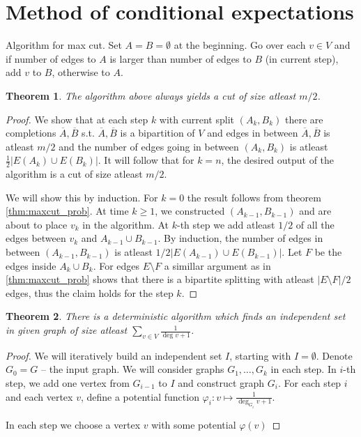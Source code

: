 \documentclass{article}
\theoremstyle{plain}
\newtheorem{thm}{Theorem}
\theoremstyle{definition}
\begin{document}
\section{Method of conditional expectations}


Algorithm for max cut. Set $A=B=\emptyset$ at the beginning. Go over each $v\in V$ and if number of edges to $A$ is larger than number of edges to $B$ (in current step), add $v$ to $B$, otherwise to $A$.

\begin{thm}
	The algorithm above always yields a cut of size atleast $m/2$.
\end{thm}
\begin{proof}
	We show that at each step $k$ with current split $(A_k,B_k)$ there are completions $\overline{A},\overline{B}$ s.t. $\overline{A},\overline{B}$ is a bipartition of $V$ and edges in between $\overline{A},\overline{B}$ is atleast $m/2$ and the number of edges going in between $(A_k,B_k)$ is atleast $\frac{1}{2}|E(A_k)\cup E(B_k)|$. It will follow that for $k=n$, the desired output of the algorithm is a cut of size atleast $m/2$.
	
	We will show this by induction. For $k=0$ the result follows from theorem \ref{thm:maxcut_prob}. At time $k\geq 1$, we constructed $(A_{k-1},B_{k-1})$ and are about to place $v_k$ in the algorithm. At $k$-th step we add atleast $1/2$ of all the edges between $v_k$ and $A_{k-1}\cup B_{k-1}$. By induction, the number of edges in between $(A_{k-1},B_{k-1})$ is atleast $1/2|E(A_{k-1})\cup E(B_{k-1})|$. Let $F$ be the edges inside $A_{k}\cup B_k$. For edges $E\setminus F$ a simillar argument as in \ref{thm:maxcut_prob} shows that there is a bipartite splitting with atleast $|E\setminus F|/2$ edges, thus the claim holds for the step $k$.
\end{proof}

\begin{thm}
	There is a deterministic algorithm which finds an independent set in given graph of size atleast $\sum_{v\in V}\frac{1}{\deg v + 1}$.
\end{thm}
\begin{proof}
	We will iteratively build an independent set $I$, starting with $I=\emptyset$. Denote $G_0=G$ -- the input graph. We will consider graphs $G_1,\ldots,G_k$ in each step. In $i$-th step, we add one vertex from $G_{i-1}$ to $I$ and construct graph $G_i$. For each step $i$ and each vertex $v$, define a potential function $\varphi_i:v\mapsto \frac{1}{\deg_{G_i} v+1}$.
	
	
	
	In each step we choose a vertex $v$ with some potential $\varphi(v)$
\end{proof}
\end{document}
